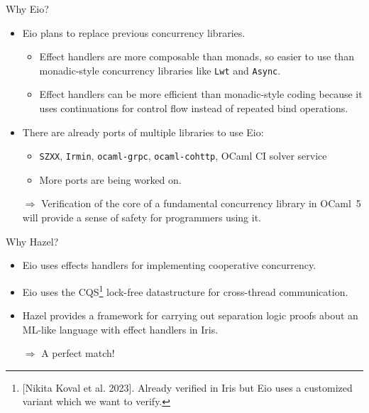 \documentclass[aspectratio=43]{beamer}
\newcommand{\ocf}{OCaml~5}
\begin{document}
\begin{frame}{Why Eio?}
    \begin{itemize}
        \item Eio plans to replace previous concurrency libraries.
              \begin{itemize}
                  \item Effect handlers are more composable than monads, so easier to use than monadic-style concurrency libraries like \texttt{Lwt} and \texttt{Async}.
                  \item Effect handlers can be more efficient than monadic-style coding because it uses continuations for control flow instead of repeated bind operations.
              \end{itemize}
        \item There are already ports of multiple libraries to use Eio:
              \begin{itemize}
                  \item \texttt{SZXX}, \texttt{Irmin}, \texttt{ocaml-grpc}, \texttt{ocaml-cohttp}, OCaml CI solver service
                  \item More ports are being worked on.
              \end{itemize}
        \item[\(\Rightarrow\)] Verification of the core of a fundamental concurrency library in \ocf{} will provide a sense of safety for programmers using it.
    \end{itemize}
\end{frame}

\begin{frame}{Why Hazel?}
    \begin{itemize}
        \item Eio uses effects handlers for implementing cooperative concurrency.
        \item Eio uses the CQS\footnote{[Nikita Koval et al. 2023]. Already verified in Iris but Eio uses a customized variant which we want to verify.} lock-free datastructure for cross-thread communication.
        \item Hazel provides a framework for carrying out separation logic proofs about an ML-like language with effect handlers in Iris.
        \item[\(\Rightarrow\)] A perfect match!
    \end{itemize}

\end{frame}
\end{document}
